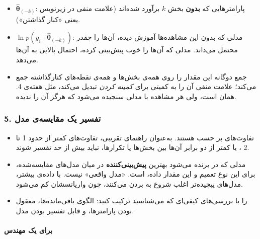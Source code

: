 \begin{itemize}
\tightlist
\item
  \(\hat{\boldsymbol\theta}_{(-k)}\): پارامترهایی که \textbf{بدون} بخش
  \(k\) برآورد شده‌اند (علامت منفی در زیرنویس یعنی «کنار گذاشتن»).
\item
  \(\ln p(y_i \mid \hat{\boldsymbol\theta}_{(-k)})\): مدلی که بدون این
  مشاهده‌ها آموزش دیده، آن‌ها را چقدر محتمل می‌داند. مدلی که آن‌ها را خوب
  پیش‌بینی کرده، احتمال بالایی به آن‌ها می‌دهد.
\item
  جمع دوگانه این مقدار را روی همه‌ی بخش‌ها و همه‌ی نقطه‌های کنارگذاشته جمع
  می‌کند؛ علامت منفی آن را به کمیتی برای \emph{کمینه کردن} تبدیل می‌کند،
  مثل  هفته‌ی 4. همان  است، ولی هر مشاهده با مدلی سنجیده
  می‌شود که هرگز آن را ندیده.
\end{itemize}

\subsubsection{5. تفسیر یک مقایسه‌ی مدل}

\begin{itemize}
\tightlist
\item
  تفاوت‌های  بر حسب \textbf{} هستند. به‌عنوان راهنمای
  تقریبی، تفاوت‌های کمتر از حدود 1 تا 2 ، یا کمتر از دو برابر
   آن‌ها بین بخش‌ها یا تکرارها، نباید بیش از حد تفسیر شوند.
\item
  مدلی که در  برنده می‌شود بهترین \textbf{پیش‌بینی‌کننده} در میان
  مدل‌های مقایسه‌شده، برای این نوع تعمیم و این مقدار داده، است. «مدل
  واقعی» نیست. با داده‌ی بیشتر، مدل‌های پیچیده‌تر اغلب شروع به بردن می‌کنند،
  چون واریانسشان کم می‌شود.
\item
   را با بررسی‌های کیفی‌ای که می‌شناسید ترکیب کنید: الگوی
  باقی‌مانده‌ها، معقول بودن پارامترها، و قابل تفسیر بودن مدل.
\end{itemize}

\paragraph{برای یک مهندس}

